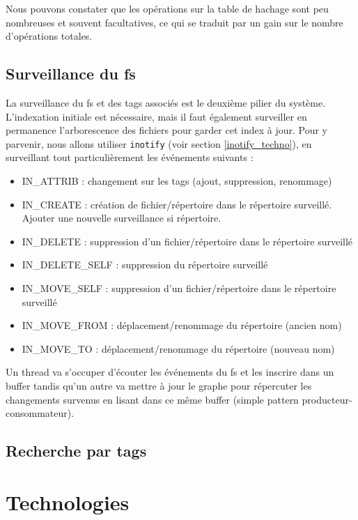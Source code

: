\documentclass[a4paper, 12pt]{article}
\begin{document}
Nous pouvons constater que les opérations sur la table de hachage sont peu nombreuses et souvent 
facultatives, ce qui se traduit par un gain sur le nombre d'opérations totales.

\subsection{Surveillance du \acrshort{fs}}
La surveillance du \acrshort{fs} et des tags associés est le deuxième pilier du système. 
L'indexation initiale est nécessaire, mais il faut également surveiller en permanence 
l'arborescence des fichiers pour garder cet index à jour. Pour y parvenir, nous allons utiliser 
\texttt{inotify} (voir section \ref{inotify_techno}), en surveillant tout particulièrement les événements 
suivants :
\begin{itemize}
    \item IN\_ATTRIB : changement sur les tags (ajout, suppression, renommage)
    \item IN\_CREATE : création de fichier/répertoire dans le répertoire surveillé. Ajouter une nouvelle surveillance si répertoire.
    \item IN\_DELETE : suppression d'un fichier/répertoire dans le répertoire surveillé
    \item IN\_DELETE\_SELF : suppression du répertoire surveillé
    \item IN\_MOVE\_SELF : suppression d'un fichier/répertoire dans le répertoire surveillé
    \item IN\_MOVE\_FROM : déplacement/renommage du répertoire (ancien nom)
    \item IN\_MOVE\_TO : déplacement/renommage du répertoire (nouveau nom)
\end{itemize}
Un thread va s'occuper d'écouter les événements du \acrshort{fs} et les inscrire dans un buffer 
tandis qu'un autre va mettre à jour le graphe pour répercuter les changements survenus en lisant 
dans ce même buffer (simple pattern producteur-consommateur).

\subsection{Recherche par tags}

\newpage

\section{Technologies} %
\end{document}
